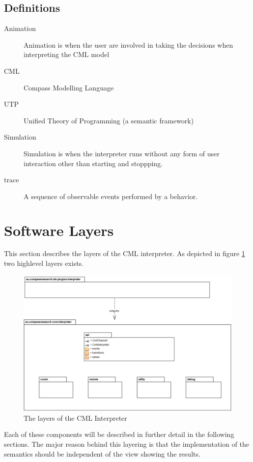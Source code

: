 \documentclass[a4paper, 10pt]{include/compassreport}   %
\begin{document}
\subsection{Definitions}
\begin{description}
\item[Animation] Animation is when the user are involved in taking
  the decisions when interpreting the CML model

\item[CML] Compass Modelling Language
\item[UTP] Unified Theory of Programming (a semantic framework)
\item[Simulation] Simulation is when the interpreter runs without
  any form of user interaction other than starting and stoppping.
\item[trace] A sequence of observable events performed by a behavior.
\end{description}

\section{Software Layers}
\label{sec:software_layers}
This section describes the layers of the CML
interpreter. As depicted in figure \ref{fig:layers} two highlevel layers exists.

\begin{figure}[ht!]
  \begin{center}
    \includegraphics[width=1\textwidth]{figures/layers}
    \caption{The layers of the CML Interpreter}
    \label{fig:layers}
  \end{center}
\end{figure}

Each of these components will be described in further detail in the
following sections. The major reason behind this layering is that the
implementation of the semantics should be independent of the view
showing the results.
\end{document}
